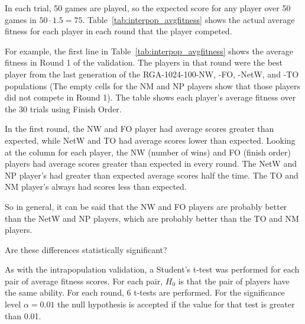 In each trial, 50 games are played, so the expected score for any player over 50
games in \(50 \cdot 1.5 = 75\). Table~\ref{tab:interpop_avgfitness} shows the
actual average fitness for each player in each round that the player competed.

For example, the first line in Table~\ref{tab:interpop_avgfitness} shows the
average fitness in Round 1 of the validation. The players in that round were the
best player from the last generation of the RGA-1024-100-NW, -FO, -NetW, and -TO
populations (The empty cells for the NM and NP players show that those players
did not compete in Round 1). The table shows each player's average fitness over
the 30 trials using Finish Order.

In the first round, the NW and FO player had average scores greater than
expected, while NetW and TO had average scores lower than expected. Looking at
the column for each player, the NW (number of wins) and FO (finish order)
players had average scores greater than expected in every round. The NetW and NP
player's had greater than expected average scores half the time. The TO and NM
player's always had scores less than expected.

So in general, it can be said that the NW and FO players are probably better
than the NetW and NP players, which are probably better than the TO and NM
players.

Are these differences statistically significant?

As with the intrapopulation validation, a Student's t-test was performed for
each pair of average fitness scores. For each pair, $H_{0}$ is that the pair of
players have the same ability. For each round, 6 t-tests are performed. For the
significance level \(\alpha=0.01\) the null hypothesis is accepted if the
value for that test is greater than 0.01. 

